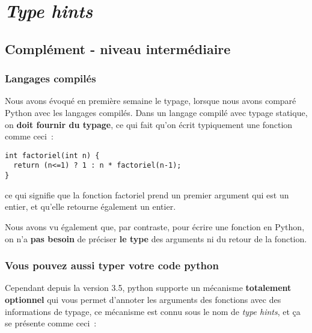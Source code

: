     
    
    
    

    

    \hypertarget{type-hints}{%
\section{\texorpdfstring{\emph{Type
hints}}{Type hints}}\label{type-hints}}

    \hypertarget{compluxe9ment---niveau-intermuxe9diaire}{%
\subsection{Complément - niveau
intermédiaire}\label{compluxe9ment---niveau-intermuxe9diaire}}

    \hypertarget{langages-compiluxe9s}{%
\subsubsection{Langages compilés}\label{langages-compiluxe9s}}

    Nous avons évoqué en première semaine le typage, lorsque nous avons
comparé Python avec les langages compilés. Dans un langage compilé avec
typage statique, on \textbf{doit fournir du typage}, ce qui fait qu'on
écrit typiquement une fonction comme ceci~:

\begin{verbatim}
int factoriel(int n) {
  return (n<=1) ? 1 : n * factoriel(n-1);
}
\end{verbatim}

ce qui signifie que la fonction factoriel prend un premier argument qui
est un entier, et qu'elle retourne également un entier.

    Nous avons vu également que, par contraste, pour écrire une fonction en
Python, on n'a \textbf{pas besoin} de préciser \textbf{le type} des
arguments ni du retour de la fonction.

    \hypertarget{vous-pouvez-aussi-typer-votre-code-python}{%
\subsubsection{Vous pouvez aussi typer votre code
python}\label{vous-pouvez-aussi-typer-votre-code-python}}

    Cependant depuis la version 3.5, python supporte un mécanisme
\textbf{totalement optionnel} qui vous permet d'annoter les arguments
des fonctions avec des informations de typage, ce mécanisme est connu
sous le nom de \emph{type hints}, et ça se présente comme ceci~:

